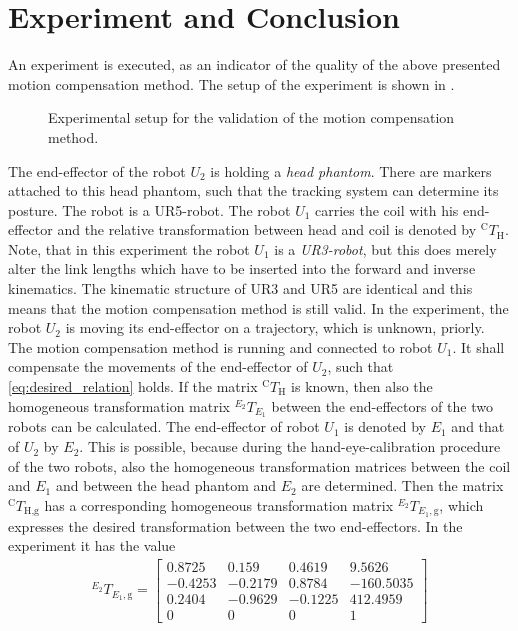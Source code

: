 \section{Experiment and Conclusion}
An experiment is executed, as an indicator of the quality of the above presented motion compensation method. The setup of the experiment is shown in .
\begin{figure}
\centering

\caption{Experimental setup for the validation of the motion compensation method.}
\label{fig:experiment}
\end{figure}
The end-effector of the robot $U_{2}$ is holding a \textit{head phantom}. There are markers attached to this head phantom, such that the tracking system can determine its posture. The robot is a UR5-robot. The robot $U_{1}$ carries the coil with his end-effector and the relative transformation between head and coil is denoted by $^{\text{C}}T_{\text{H}}$. Note, that in this experiment the robot $U_{1}$ is a \textit{UR3-robot}, but this does merely alter the link lengths which have to be inserted into the forward and inverse kinematics. The kinematic structure of UR3 and UR5 are identical and this means that the motion compensation method is still valid. In the experiment, the robot $U_{2}$ is moving its end-effector on a trajectory, which is unknown, priorly. The motion compensation method is running and connected to robot $U_{1}$. It shall compensate the movements of the end-effector of $U_{2}$, such that \eqref{eq:desired_relation} holds. If the matrix $^{\text{C}}T_{\text{H}}$ is known, then also the homogeneous transformation matrix $^{E_{2}}T_{E_{1}}$ between the end-effectors of the two robots can be calculated. The end-effector of robot $U_{1}$ is denoted by $E_{1}$ and that of $U_{2}$ by $E_{2}$. This is possible, because during the hand-eye-calibration procedure of the two robots, also the homogeneous transformation matrices between the coil and $E_{1}$ and between the head phantom and $E_{2}$ are determined. Then the matrix $^{\text{C}}T_{\text{H,g}}$ has a corresponding homogeneous transformation matrix $^{E_{2}}T_{E_{1},\text{g}}$, which expresses the desired transformation between the two end-effectors. In the experiment it has the value
\begin{align*}
^{E_{2}}T_{E_{1},\text{g}} = 
\begin{bmatrix}
0.8725 & 0.159 & 0.4619 & 9.5626\\ 
-0.4253 & -0.2179 & 0.8784 & -160.5035\\ 
0.2404 & -0.9629 & -0.1225 & 412.4959\\ 
0 & 0 & 0 & 1
\end{bmatrix}
\end{align*}
